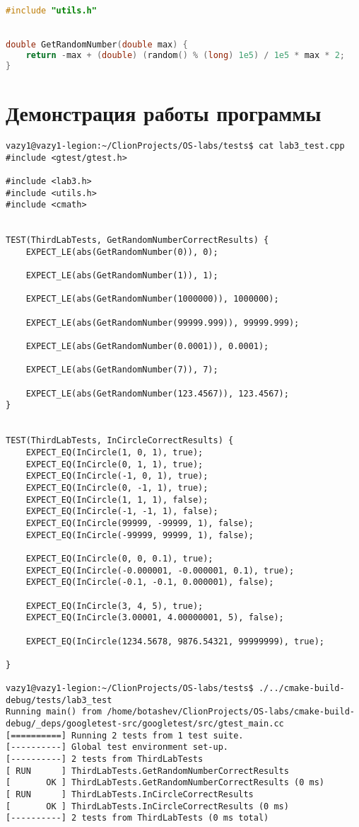 \documentclass[pdf, unicode, 12pt, a4paper,oneside,fleqn]{article}
\begin{document}
\begin{lstlisting}[language=C++]
#include "utils.h"


double GetRandomNumber(double max) {
    return -max + (double) (random() % (long) 1e5) / 1e5 * max * 2;
}
\end{lstlisting}

\section{Демонстрация работы программы}

\begin{verbatim}
vazy1@vazy1-legion:~/ClionProjects/OS-labs/tests$ cat lab3_test.cpp 
#include <gtest/gtest.h>

#include <lab3.h>
#include <utils.h>
#include <cmath>


TEST(ThirdLabTests, GetRandomNumberCorrectResults) {
    EXPECT_LE(abs(GetRandomNumber(0)), 0);

    EXPECT_LE(abs(GetRandomNumber(1)), 1);

    EXPECT_LE(abs(GetRandomNumber(1000000)), 1000000);

    EXPECT_LE(abs(GetRandomNumber(99999.999)), 99999.999);

    EXPECT_LE(abs(GetRandomNumber(0.0001)), 0.0001);

    EXPECT_LE(abs(GetRandomNumber(7)), 7);

    EXPECT_LE(abs(GetRandomNumber(123.4567)), 123.4567);
}


TEST(ThirdLabTests, InCircleCorrectResults) {
    EXPECT_EQ(InCircle(1, 0, 1), true);
    EXPECT_EQ(InCircle(0, 1, 1), true);
    EXPECT_EQ(InCircle(-1, 0, 1), true);
    EXPECT_EQ(InCircle(0, -1, 1), true);
    EXPECT_EQ(InCircle(1, 1, 1), false);
    EXPECT_EQ(InCircle(-1, -1, 1), false);
    EXPECT_EQ(InCircle(99999, -99999, 1), false);
    EXPECT_EQ(InCircle(-99999, 99999, 1), false);

    EXPECT_EQ(InCircle(0, 0, 0.1), true);
    EXPECT_EQ(InCircle(-0.000001, -0.000001, 0.1), true);
    EXPECT_EQ(InCircle(-0.1, -0.1, 0.000001), false);

    EXPECT_EQ(InCircle(3, 4, 5), true);
    EXPECT_EQ(InCircle(3.00001, 4.00000001, 5), false);

    EXPECT_EQ(InCircle(1234.5678, 9876.54321, 99999999), true);

}

vazy1@vazy1-legion:~/ClionProjects/OS-labs/tests$ ./../cmake-build-debug/tests/lab3_test 
Running main() from /home/botashev/ClionProjects/OS-labs/cmake-build-debug/_deps/googletest-src/googletest/src/gtest_main.cc
[==========] Running 2 tests from 1 test suite.
[----------] Global test environment set-up.
[----------] 2 tests from ThirdLabTests
[ RUN      ] ThirdLabTests.GetRandomNumberCorrectResults
[       OK ] ThirdLabTests.GetRandomNumberCorrectResults (0 ms)
[ RUN      ] ThirdLabTests.InCircleCorrectResults
[       OK ] ThirdLabTests.InCircleCorrectResults (0 ms)
[----------] 2 tests from ThirdLabTests (0 ms total)


\end{verbatim}
\end{document}
